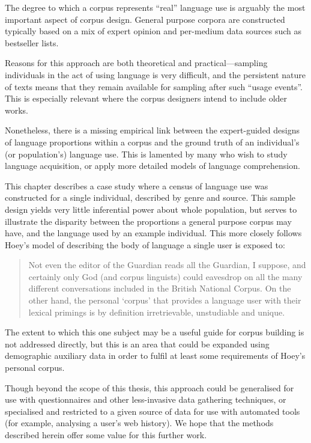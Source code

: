 The degree to which a corpus represents ``real'' language use is arguably the most important aspect of corpus design.  General purpose corpora are constructed typically based on a mix of expert opinion and per-medium data sources such as bestseller lists.


Reasons for this approach are both theoretical and practical---sampling individuals in the act of using language is very difficult, and the persistent nature of texts means that they remain available for sampling after such ``usage events''.  This is especially relevant where the corpus designers intend to include older works.

Nonetheless, there is a missing empirical link between the expert-guided designs of language proportions within a corpus and the ground truth of an individual's (or population's) language use.  This is lamented by many who wish to study language acquisition, or apply more detailed models of language comprehension.

This chapter describes a case study where a census of language use was constructed for a single individual, described by genre and source.  This sample design yields very little inferential power about whole population, but serves to illustrate the disparity between the proportions a general purpose corpus may have, and the language used by an example individual.  This more closely follows Hoey's \cite{hoey2005lexical} model of describing the body of language a single user is exposed to:

\begin{quote}
    Not even the editor of the Guardian reads all the Guardian, I suppose, and certainly only God (and corpus linguists) could eavesdrop on all the many different conversations included in the British National Corpus.  On the other hand, the personal `corpus' that provides a language user with their lexical primings is by definition irretrievable, unstudiable and unique.
\end{quote}

The extent to which this one subject may be a useful guide for corpus building is not addressed directly, but this is an area that could be expanded using demographic auxiliary data in order to fulfil at least some requirements of Hoey's personal corpus.

Though beyond the scope of this thesis, this approach could be generalised for use with questionnaires and other less-invasive data gathering techniques, or specialised and restricted to a given source of data for use with automated tools (for example, analysing a user's web history).  We hope that the methods described herein offer some value for this further work.

